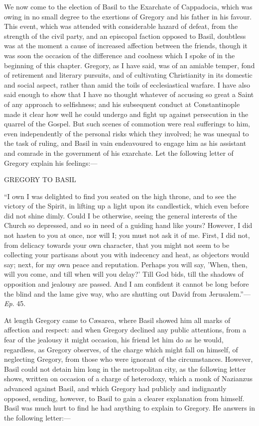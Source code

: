 We now come to the election of Basil to the Exarchate of Cappadocia,
which was owing in no small degree to the exertions of Gregory and his
father in his favour. This event, which was attended with considerable
hazard of defeat, from the strength of the civil party, and an
episcopal faction opposed to Basil, doubtless was at the moment a
cause of increased affection between the friends, though it was soon
the occasion of the difference and coolness which I spoke of in the
beginning of this chapter. Gregory, as I have said, was of an amiable
temper, fond of retirement and literary pursuits, and of cultivating
Christianity in its domestic and social aspect, rather than amid the
toils of ecclesiastical warfare. I have also said enough to show that
I have no thought whatever of accusing so great a Saint of any
approach to selfishness; and his subsequent conduct at Constantinople
made it clear how well he could undergo and fight up against
persecution in the quarrel of the Gospel. But such scenes of commotion
were real sufferings to him, even independently of the personal risks
which they involved; he was unequal to the task of ruling, and Basil
in vain endeavoured to engage him as his assistant and comrade in
the government of his exarchate. Let the following letter of Gregory
explain his feelings:—

GREGORY TO BASIL

``I own I was delighted to find you seated on the high throne,
and to see the victory of the Spirit, in lifting up a light upon its
candlestick, which even before did not shine dimly. Could I be
otherwise, seeing the general interests of the Church so depressed,
and so in need of a guiding hand like yours? However, I did not hasten
to you at once, nor will I; you must not ask it of me. First, I did
not, from delicacy towards your own character, that you might not seem
to be collecting your partisans about you with indecency and heat, as
objectors would say; next, for my own peace and reputation. Perhaps
you will say, 'When, then, will you come, and till when will you
delay?' Till God bids, till the shadows of opposition and jealousy are
passed. And I am confident it cannot be long before the blind and the
lame give way, who are shutting out David from Jerusalem.''—\emph{Ep}.
45.

At length Gregory came to Cæsarea, where Basil showed him all
marks of affection and respect: and when Gregory declined any public
attentions, from a fear of the jealousy it might occasion, his friend
let him do as he would, regardless, as Gregory observes, of the charge
which might fall on himself, of neglecting Gregory, from those who
were ignorant of the circumstances. However, Basil could not detain
him long in the metropolitan city, as the following letter shows,
written on occasion of a charge of heterodoxy, which a monk of
Nazianzus advanced against Basil, and which Gregory had publicly and
indignantly opposed, sending, however, to Basil to gain a clearer
explanation from himself. Basil was much hurt to find he had anything
to explain to Gregory. He answers in the following letter:—


